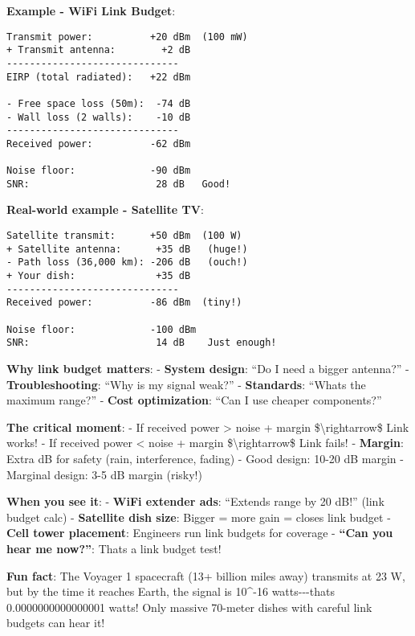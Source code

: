 \textbf{Example - WiFi Link Budget}:

\begin{verbatim}
Transmit power:          +20 dBm  (100 mW)
+ Transmit antenna:        +2 dB
------------------------------
EIRP (total radiated):   +22 dBm

- Free space loss (50m):  -74 dB
- Wall loss (2 walls):    -10 dB
------------------------------
Received power:          -62 dBm

Noise floor:             -90 dBm
SNR:                      28 dB   Good!
\end{verbatim}

\textbf{Real-world example - Satellite TV}:

\begin{verbatim}
Satellite transmit:      +50 dBm  (100 W)
+ Satellite antenna:      +35 dB   (huge!)
- Path loss (36,000 km): -206 dB   (ouch!)
+ Your dish:              +35 dB
------------------------------
Received power:          -86 dBm  (tiny!)

Noise floor:             -100 dBm
SNR:                      14 dB    Just enough!
\end{verbatim}

\textbf{Why link budget matters}: - \textbf{System design}: ``Do I need
a bigger antenna?'' - \textbf{Troubleshooting}: ``Why is my signal
weak?'' - \textbf{Standards}: ``What\textquotesingle s the maximum
range?'' - \textbf{Cost optimization}: ``Can I use cheaper components?''

\textbf{The critical moment}: - If received power \textgreater{} noise +
margin \$\textbackslash rightarrow\$ Link works! - If received power
\textless{} noise + margin \$\textbackslash rightarrow\$ Link fails! -
\textbf{Margin}: Extra dB for safety (rain, interference, fading) - Good
design: 10-20 dB margin - Marginal design: 3-5 dB margin (risky!)

\textbf{When you see it}: - \textbf{WiFi extender ads}: ``Extends range
by 20 dB!'' (link budget calc) - \textbf{Satellite dish size}: Bigger =
more gain = closes link budget - \textbf{Cell tower placement}:
Engineers run link budgets for coverage - \textbf{``Can you hear me
now?''}: That\textquotesingle s a link budget test!

\textbf{Fun fact}: The Voyager 1 spacecraft (13+ billion miles away)
transmits at 23 W, but by the time it reaches Earth, the signal is
10\^{}-16 watts-\/-\/-that\textquotesingle s 0.0000000000000001 watts!
Only massive 70-meter dishes with careful link budgets can hear it!


